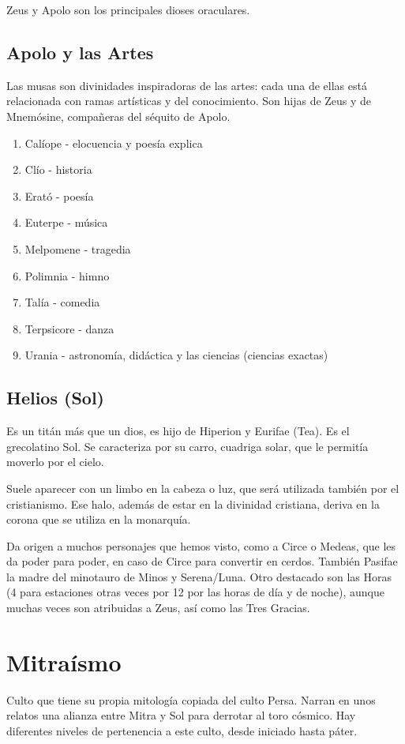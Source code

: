 Zeus y Apolo son los principales dioses oraculares.

\subsection{Apolo y las Artes}
Las musas son divinidades inspiradoras de las artes: cada una de ellas está relacionada con ramas artísticas y del conocimiento. Son hijas de Zeus y de Mnemósine, compañeras del séquito de Apolo.
\begin{enumerate}
    \item Calíope - elocuencia y poesía explica
    \item Clío - historia
    \item Erató - poesía
    \item Euterpe - música
    \item Melpomene - tragedia
    \item Polimnia - himno
    \item Talía - comedia
    \item Terpsicore - danza
    \item Urania - astronomía, didáctica y las ciencias (ciencias exactas)
\end{enumerate}

\subsection{Helios (Sol)}
Es un titán más que un dios, es hijo de Hiperion y Eurifae (Tea). Es el grecolatino Sol. Se caracteriza por su carro, cuadriga solar, que le permitía moverlo por el cielo.
 
Suele aparecer con un limbo en la cabeza o luz, que será utilizada también por el cristianismo. Ese halo, además de estar en la divinidad cristiana, deriva en la corona que se utiliza en la monarquía.

Da origen a muchos personajes que hemos visto, como a Circe o Medeas, que les da poder para poder, en caso de Circe para convertir en cerdos. También Pasifae la madre del minotauro de Minos y Serena/Luna. Otro destacado son las Horas (4 para estaciones otras veces por 12 por las horas de día y de noche), aunque muchas veces son atribuidas a Zeus, así como las Tres Gracias.

\section{Mitraísmo}
Culto que tiene su propia mitología copiada del culto Persa. Narran en unos relatos una alianza entre Mitra y Sol para derrotar al toro cósmico. Hay diferentes niveles de pertenencia a este culto, desde iniciado hasta páter.

